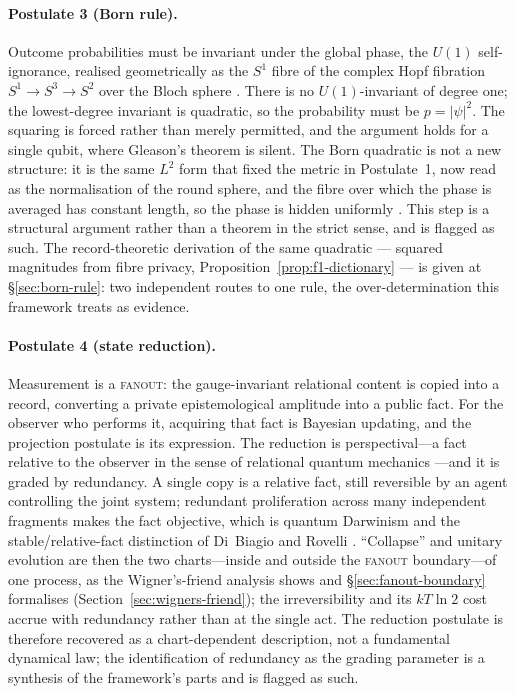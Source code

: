 \paragraph{Postulate 3 (Born rule).}
\label{sec:born-invariance}
Outcome probabilities must be invariant under the global phase, the $U(1)$
self-ignorance, realised geometrically as the $S^{1}$ fibre of the complex Hopf
fibration $S^{1}\to S^{3}\to S^{2}$ over the Bloch sphere
\autocite{Hopf1931, Urbantke2003}. There is no $U(1)$-invariant of degree one; the
lowest-degree invariant is quadratic, so the probability must be
$p=\lvert\psi\rvert^{2}$. The squaring is forced
rather than merely permitted, and the argument holds for a single qubit, where
Gleason's theorem is silent. The Born quadratic is not a new structure: it is the
same $L^{2}$ form that fixed the metric in Postulate~1, now read as the
normalisation of the round sphere, and the fibre over which the phase is averaged
has constant length, so the phase is hidden uniformly
\autocite{GluckWarnerZiller1986}. This step is a structural argument rather than a
theorem in the strict sense, and is flagged as such. The record-theoretic derivation of the same
quadratic --- squared magnitudes from fibre privacy, Proposition~\ref{prop:f1-dictionary} --- is
given at \S\ref{sec:born-rule}: two independent routes to one rule, the over-determination this
framework treats as evidence.

\paragraph{Postulate 4 (state reduction).}
Measurement is a \textsc{fanout}: the gauge-invariant relational content is copied
into a record, converting a private epistemological amplitude into a public
fact. For the observer who performs it, acquiring that fact is Bayesian updating,
and the projection postulate is its expression. The reduction is perspectival---a
fact relative to the observer in the sense of relational quantum mechanics
\autocite{Rovelli1996a}---and it is graded by redundancy. A single copy is a
relative fact, still reversible by an agent controlling the joint system; redundant
proliferation across many independent fragments makes the fact objective, which is
quantum Darwinism \autocite{zurek_2009} and the stable/relative-fact distinction of
Di~Biagio and Rovelli \autocite{DiBiagioRovelli2021}. ``Collapse'' and unitary
evolution are then the two charts---inside and outside the \textsc{fanout}
boundary---of one process, as the Wigner's-friend analysis shows and \S\ref{sec:fanout-boundary} formalises
(Section~\ref{sec:wigners-friend}); the irreversibility and its $kT\ln 2$ cost
\autocite{Landauer_1961, wigner_1961} accrue with redundancy rather than at the
single act. The reduction postulate is therefore recovered as a chart-dependent
description, not a fundamental dynamical law; the identification of redundancy as
the grading parameter is a synthesis of the framework's parts and is flagged as
such.

